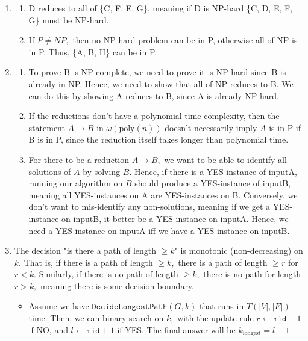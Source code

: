 \documentclass[12pt]{article}
\begin{document}
\begin{enumerate}
  \item
    \begin{enumerate}
      \item D reduces to all of \{C, F, E, G\}, meaning if D is
        NP-hard \{C, D, E, F, G\} must be NP-hard.

      \item If $P \neq NP,$ then no NP-hard problem can be in P,
        otherwise all of NP is in P. Thus, \{A, B, H\} can be in P.
    \end{enumerate}

  \item
    \begin{enumerate}
      \item To prove B is NP-complete, we need to prove it is NP-hard
        since B is already in NP. Hence, we need to show that all of
        NP reduces to B. We can do this by showing A reduces to B,
        since A is already NP-hard.

      \item If the reductions don't have a polynomial time
        complexity, then the statement $A \to B$ in
        $\omega(\text{poly}(n))$ doesn't necessarily imply $A$ is in
        P if B is in P, since the reduction itself takes longer than
        polynomial time.

      \item For there to be a reduction $A \to B,$ we want to be able
        to identify all solutions of $A$ by solving $B.$ Hence, if
        there is a YES-instance of inputA, running our algorithm on
        $B$ should produce a YES-instance of inputB, meaning all
        YES-instances on A are YES-instances on B. Conversely, we
        don't want to mis-identify any non-solutions, meaning if we
        get a YES-instance on inputB, it better be a YES-instance on
        inputA. Hence, we need a YES-instance on inputA iff we have a
        YES-instance on inputB.
    \end{enumerate}

  \item The decision "is there a path of length $\geq k$" is
    monotonic (non-decreasing) on $k.$ That is, if there is a path of
    length $\geq k,$ there is a path of length $\geq r$ for $r < k.$
    Similarly, if there is no path of length $\geq k,$ there is no
    path for length $r > k,$ meaning there is some decision boundary.

    \begin{itemize}
      \item Assume we have $\texttt{DecideLongestPath}(G, k)$ that
        runs in $T(|V|, |E|)$ time. Then, we can binary search on
        $k,$ with the update rule $r \gets \texttt{mid} - 1$ if NO,
        and $l \gets \texttt{mid} + 1$ if YES. The final answer will
        be $k_\text{longest} = l - 1$.


\end{itemize}
\end{enumerate}
\end{document}

